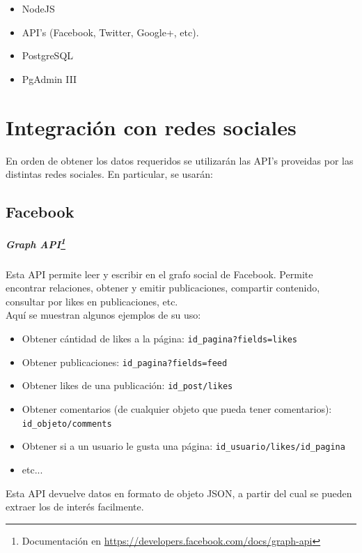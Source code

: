 \documentclass[oneside]{book}
\begin{document}
	\begin{itemize}
		\item NodeJS
		\item API's (Facebook, Twitter, Google+, etc).
		\item PostgreSQL
		\item PgAdmin III
	\end{itemize}
	
\newpage



\section{Integración con redes sociales}

En orden de obtener los datos requeridos se utilizarán las API's proveidas por las distintas redes sociales. En particular, se usarán:

\subsection{Facebook}


	\subparagraph*{Graph API\footnote{Documentaci\'{o}n en \url{https://developers.facebook.com/docs/graph-api}}}
	
	Esta API permite leer y escribir en el grafo social de Facebook.
	Permite encontrar relaciones, obtener y emitir publicaciones, compartir contenido, consultar por likes en publicaciones, etc.\\
	
	Aqu\'{i} se muestran algunos ejemplos de su uso:\\
	
	\begin{itemize}
  		\item Obtener c\'{a}ntidad de likes a la p\'{a}gina: \texttt{id\_pagina?fields=likes}
  		\item Obtener publicaciones: \texttt{id\_pagina?fields=feed}
  		\item Obtener likes de una publicaci\'{o}n: \texttt{id\_post/likes}
  		\item Obtener comentarios (de cualquier objeto que pueda tener comentarios): \texttt{id\_objeto/comments}
  		\item Obtener si a un usuario le gusta una p\'{a}gina: \texttt{id\_usuario/likes/id\_pagina}
  		\item etc...
	\end{itemize}
	
	Esta API devuelve datos en formato de objeto JSON, a partir del cual se pueden extraer los de inter\'{e}s facilmente.
	
\end{document}
